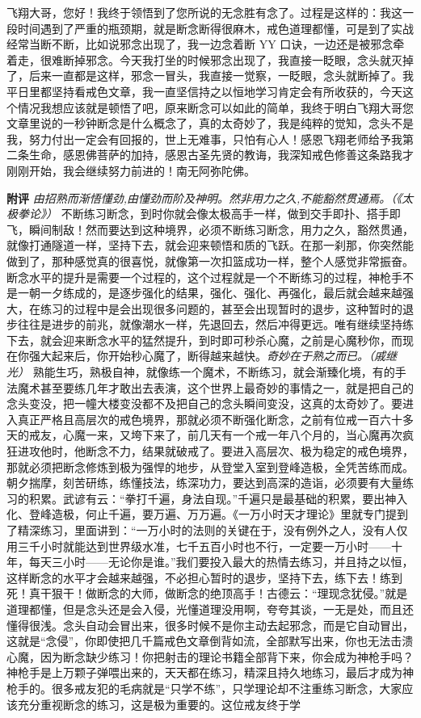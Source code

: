 \begin{case}
    飞翔大哥，您好！我终于领悟到了您所说的无念胜有念了。过程是这样的：我这一段时间遇到了严重的瓶颈期，就是断念断得很麻木，戒色道理都懂，可是到了实战经常当断不断，比如说邪念出现了，我一边念着断 YY 口诀，一边还是被邪念牵着走，很难断掉邪念。今天我打坐的时候邪念出现了，我直接一眨眼，念头就灭掉了，后来一直都是这样，邪念一冒头，我直接一觉察，一眨眼，念头就断掉了。我平日里都坚持看戒色文章，我一直坚信持之以恒地学习肯定会有所收获的，今天这个情况我想应该就是顿悟了吧，原来断念可以如此的简单，我终于明白飞翔大哥您文章里说的一秒钟断念是什么概念了，真的太奇妙了，我是纯粹的觉知，念头不是我，努力付出一定会有回报的，世上无难事，只怕有心人！感恩飞翔老师给予我第二条生命，感恩佛菩萨的加持，感恩古圣先贤的教诲，我深知戒色修善这条路我才刚刚开始，我会继续努力前进的！南无阿弥陀佛。

    \textbf{附评} \textit{由招熟而渐悟懂劲,由懂劲而阶及神明。然非用力之久,不能豁然贯通焉。（《太极拳论》）} 不断练习断念，到时你就会像太极高手一样，做到交手即扑、搭手即飞，瞬间制敌！然而要达到这种境界，必须不断练习断念，用力之久，豁然贯通，就像打通隧道一样，坚持下去，就会迎来顿悟和质的飞跃。在那一刹那，你突然能做到了，那种感觉真的很喜悦，就像第一次扣篮成功一样，整个人感觉非常振奋。断念水平的提升是需要一个过程的，这个过程就是一个不断练习的过程，神枪手不是一朝一夕练成的，是逐步强化的结果，强化、强化、再强化，最后就会越来越强大，在练习的过程中是会出现很多问题的，甚至会出现暂时的退步，这种暂时的退步往往是进步的前兆，就像潮水一样，先退回去，然后冲得更远。唯有继续坚持练下去，就会迎来断念水平的猛然提升，到时即可秒杀心魔，之前是心魔秒你，而现在你强大起来后，你开始秒心魔了，断得越来越快。\textit{奇妙在于熟之而已。（戚继光）} 熟能生巧，熟极自神，就像练一个魔术，不断练习，就会渐臻化境，有的手法魔术甚至要练几年才敢出去表演，这个世界上最奇妙的事情之一，就是把自己的念头变没，把一幢大楼变没都不及把自己的念头瞬间变没，这真的太奇妙了。要进入真正严格且高层次的戒色境界，那就必须不断强化断念，之前有位戒一百六十多天的戒友，心魔一来，又垮下来了，前几天有一个戒一年八个月的，当心魔再次疯狂进攻他时，他断念不力，结果就破戒了。要进入高层次、极为稳定的戒色境界，那就必须把断念修炼到极为强悍的地步，从登堂入室到登峰造极，全凭苦练而成。朝夕揣摩，刻苦研练，练懂技法，练深功力，要达到高深的造诣，必须要有大量练习的积累。武谚有云：“拳打千遍，身法自现。”千遍只是最基础的积累，要出神入化、登峰造极，何止千遍，要万遍、万万遍。《一万小时天才理论》里就专门提到了精深练习，里面讲到：“一万小时的法则的关键在于，没有例外之人，没有人仅用三千小时就能达到世界级水准，七千五百小时也不行，一定要一万小时——十年，每天三小时——无论你是谁。”我们要投入最大的热情去练习，并且持之以恒，这样断念的水平才会越来越强，不必担心暂时的退步，坚持下去，练下去！练到死！真干狠干！做断念的大师，做断念的绝顶高手！古德云：“理现念犹侵。”就是道理都懂，但是念头还是会入侵，光懂道理没用啊，夸夸其谈，一无是处，而且还懂得很浅。念头自动会冒出来，很多时候不是你主动去起邪念，而是它自动冒出，这就是“念侵”，你即使把几千篇戒色文章倒背如流，全部默写出来，你也无法击溃心魔，因为断念缺少练习！你把射击的理论书籍全部背下来，你会成为神枪手吗？神枪手是上万颗子弹喂出来的，天天都在练习，精深且持久地练习，最后才成为神枪手的。很多戒友犯的毛病就是“只学不练”，只学理论却不注重练习断念，大家应该充分重视断念的练习，这是极为重要的。这位戒友终于学
\end{case}
